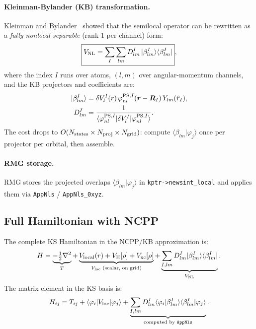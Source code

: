 \documentclass[12pt,letterpaper]{article}
\newcommand{\bra}[1]{\langle #1 \rvert}
\newcommand{\ket}[1]{\lvert #1 \rangle}
\newcommand{\braket}[2]{\langle #1 \vert #2 \rangle}
\newcommand{\mel}[3]{\langle #1 \vert #2 \vert #3 \rangle}
\newcommand{\VNL}{V_{\rm NL}}
\newcommand{\Vloc}{V_{\rm loc}}
\begin{document}
\paragraph{Kleinman-Bylander (KB) transformation.}
Kleinman and Bylander~\cite{Kleinman1982} showed that the semilocal operator
can be rewritten as a \emph{fully nonlocal separable} (rank-1 per channel) form:
\begin{equation}
  \boxed{\VNL = \sum_I \sum_{lm} D^I_{lm}\,
    \ket{\beta^I_{lm}}\bra{\beta^I_{lm}}},
  \label{eq:KB}
\end{equation}
where the index $I$ runs over atoms, $(l,m)$ over angular-momentum channels,
and the KB projectors and coefficients are:
\begin{align}
  \ket{\beta^I_{lm}} &= \delta V^I_l(r)\,\varphi^{{\rm PS},I}_{nl}(\bm{r}-\bm{R}_I)\,Y_{lm}(\hat{r}_I),
  \label{eq:KB_proj}\\
  D^I_{lm} &= \frac{1}{\mel{\varphi^{{\rm PS},I}_{nl}}{\delta V^I_l}{\varphi^{{\rm PS},I}_{nl}}}.
  \label{eq:KB_coeff}
\end{align}
The cost drops to $O(N_{\rm states} \times N_{\rm proj} \times N_{\rm grid})$:
compute $\braket{\beta_{lm}}{\varphi_j}$ once per projector per orbital, then
assemble.

\paragraph{RMG storage.}
RMG stores the projected overlaps $\braket{\beta_{lm}}{\varphi_j}$ in
\texttt{kptr->newsint\_local} and applies them via
\texttt{AppNls} / \texttt{AppNls\_0xyz}.

\subsection{Full Hamiltonian with NCPP}
\label{sec:pp:hamiltonian}

The complete KS Hamiltonian in the NCPP/KB approximation is:
\begin{equation}
  H = \underbrace{-\tfrac{1}{2}\nabla^2}_{T}
    + \underbrace{V_{\rm local}(r) + V_{\rm H}[\rho] + V_{\rm xc}[\rho]}_{\Vloc\text{ (scalar, on grid)}}
    + \underbrace{\sum_{I,lm} D^I_{lm}\ket{\beta^I_{lm}}\bra{\beta^I_{lm}}}_{\VNL}.
  \label{eq:full_H}
\end{equation}
The matrix element in the KS basis is:
\begin{equation}
  H_{ij} = T_{ij} + \mel{\varphi_i}{\Vloc}{\varphi_j}
  + \underbrace{\sum_{I,lm} D^I_{lm}\braket{\varphi_i}{\beta^I_{lm}}\braket{\beta^I_{lm}}{\varphi_j}}_{\text{computed by \texttt{AppNls}}}.
  \label{eq:H_matrix}
\end{equation}
\end{document}
